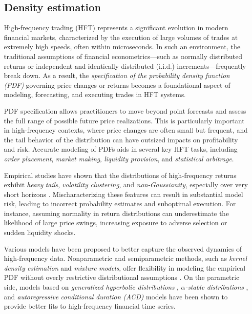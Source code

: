 \documentclass[article]{abntex2}
\begin{document}
\subsection{Density estimation}
High-frequency trading (HFT) represents a significant evolution in modern financial markets, characterized by the execution of large volumes of trades at extremely high speeds, often within microseconds. In such an environment, the traditional assumptions of financial econometrics—such as normally distributed returns or independent and identically distributed (i.i.d.) increments—frequently break down. As a result, the \textit{specification of the probability density function (PDF)} governing price changes or returns becomes a foundational aspect of modeling, forecasting, and executing trades in HFT systems.

PDF specification allows practitioners to move beyond point forecasts and assess the full range of possible future price realizations. This is particularly important in high-frequency contexts, where price changes are often small but frequent, and the tail behavior of the distribution can have outsized impacts on profitability and risk. Accurate modeling of PDFs aids in several key HFT tasks, including \textit{order placement}, \textit{market making}, \textit{liquidity provision}, and \textit{statistical arbitrage}.

Empirical studies have shown that the distributions of high-frequency returns exhibit \textit{heavy tails}, \textit{volatility clustering}, and \textit{non-Gaussianity}, especially over very short horizons . Mischaracterizing these features can result in substantial model risk, leading to incorrect probability estimates and suboptimal execution. For instance, assuming normality in return distributions can underestimate the likelihood of large price swings, increasing exposure to adverse selection or sudden liquidity shocks.

Various models have been proposed to better capture the observed dynamics of high-frequency data. Nonparametric and semiparametric methods, such as \textit{kernel density estimation} and \textit{mixture models}, offer flexibility in modeling the empirical PDF without overly restrictive distributional assumptions . On the parametric side, models based on \textit{generalized hyperbolic distributions} , \textit{$\alpha$-stable distributions} , and \textit{autoregressive conditional duration (ACD)} models  have been shown to provide better fits to high-frequency financial time series.
\end{document}
